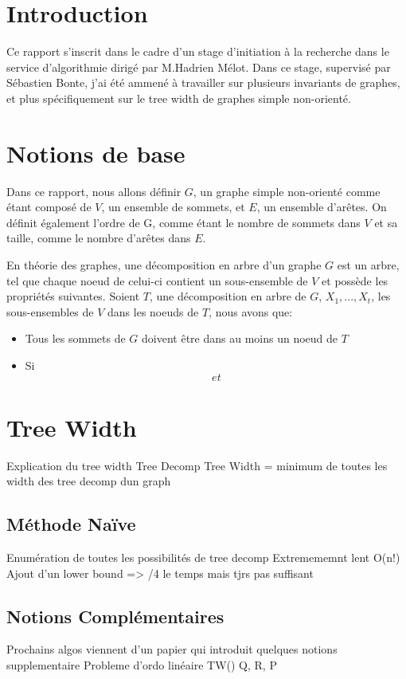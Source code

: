 \documentclass[a4paper, 12pt]{article}
\begin{document}
\tableofcontents

\newpage

\section{Introduction}
Ce rapport s'inscrit dans le cadre d'un stage d'initiation à la recherche dans le service d'algorithmie
dirigé par M.Hadrien Mélot. Dans ce stage, supervisé par Sébastien Bonte, j'ai été ammené à travailler sur plusieurs invariants de graphes, et plus spécifiquement sur le tree width de graphes simple non-orienté.

\section{Notions de base}
Dans ce rapport, nous allons définir $G$, un graphe simple non-orienté comme étant composé de
$V$, un ensemble de sommets, et $E$, un ensemble d'arêtes. On définit également l'ordre de G, comme étant
le nombre de sommets dans $V$ et sa taille, comme le nombre d'arêtes dans $E$.

En théorie des graphes, une décomposition en arbre d'un graphe $G$ est un arbre,
tel que chaque noeud de celui-ci contient un sous-ensemble de $V$ et possède les propriétés suivantes.
Soient $T$, une décomposition en arbre de $G$,
$X_1,...,X_t$, les sous-ensembles de $V$ dans les noeuds de $T$, nous avons que:

\begin{itemize}
  \item Tous les sommets de $G$ doivent être dans au moins un noeud de $T$
  \item Si $$ et $$
\end{itemize}

\section{Tree Width}


Explication du tree width
Tree Decomp
Tree Width = minimum de toutes les width des tree decomp dun graph

\subsection{Méthode Naïve}
Enumération de toutes les possibilités de tree decomp
Extremememnt lent O(n!)
Ajout d'un lower bound => /4 le temps mais tjrs pas suffisant

\subsection{Notions Complémentaires}
Prochains algos viennent d'un papier qui introduit quelques notions supplementaire
Probleme d'ordo linéaire
TW()
Q, R, P
\end{document}
